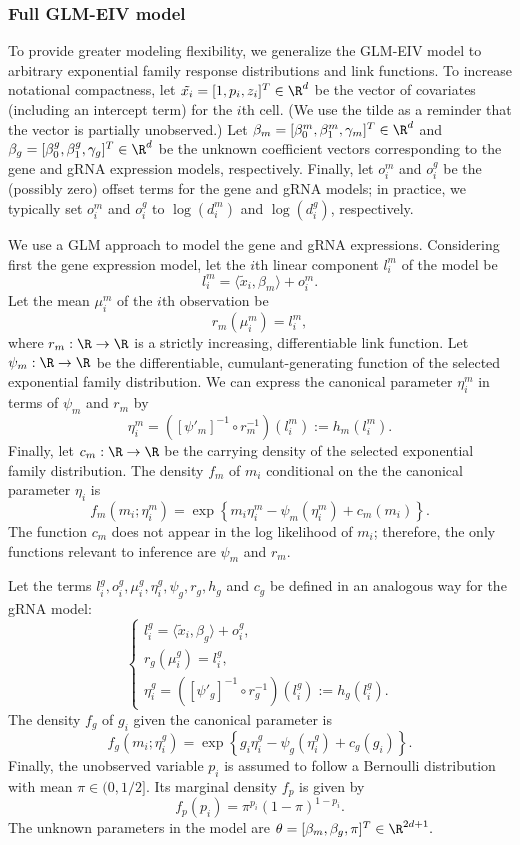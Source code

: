 \documentclass[12pt]{article}
\begin{document}
\subsubsection*{Full GLM-EIV model}
To provide greater modeling flexibility, we generalize the GLM-EIV model to arbitrary exponential family response distributions and link functions. To increase notational compactness, let $\tilde{x_i} = [1, p_i, z_i]^T \in \R^d$ be the vector of covariates (including an intercept term) for the $i$th cell. (We use the tilde as a reminder that the vector is partially unobserved.) Let $\beta_m = [\beta^m_0, \beta^m_1, \gamma_m]^T \in \R^d$ and $\beta_g = [\beta^g_0, \beta^g_1, \gamma_g]^T \in \R^d$ be the unknown coefficient vectors corresponding to the gene and gRNA expression models, respectively. Finally, let $o^m_i$ and $o^g_i$ be the (possibly zero) offset terms for the gene and gRNA models; in practice, we typically set $o^m_i$ and $o^g_i$ to $\log(d^m_i)$ and $\log(d^g_i)$, respectively.

We use a GLM approach to model the gene and gRNA expressions. Considering first the gene expression model, let the $i$th linear component $l^m_i$ of the model be $$l^m_i = \langle \tilde{x}_i, \beta_m \rangle + o^m_i.$$ Let the mean $\mu^m_i$ of the $i$th observation be
$$r_m(\mu^m_i) = l^m_i,$$ where $r_m:\R \to \R$ is a strictly increasing, differentiable link function. Let $\psi_m: \R \to \R$ be the differentiable, cumulant-generating function of the selected exponential family distribution. We can express the canonical parameter $\eta^m_i$ in terms of $\psi_m$ and $r_m$ by
$$\eta^m_i = \left([\psi'_m]^{-1} \circ r^{-1}_m\right)(l_i^m) := h_m(l_i^m).$$ Finally, let $c_m: \R \to \R$ be the carrying density of the selected exponential family distribution. The density $f_m$ of $m_i$ conditional on the the canonical parameter $\eta_i$ is
$$f_m(m_i; \eta^m_i) = \exp\left\{ m_i \eta^m_i - \psi_m(\eta^m_i) + c_m(m_i) \right\}.$$ The function $c_m$ does not appear in the log likelihood of $m_i$; therefore, the only functions relevant to inference are $\psi_m$ and $r_m$.

Let the terms $l^g_i, o^g_i, \mu^g_i, \eta^g_i, \psi_g, r_g, h_g$ and $c_g$ be defined in an analogous way for the gRNA model:
$$
\begin{cases}
l^g_i = \langle \tilde{x}_i, \beta_g \rangle + o^g_i,\\
r_g(\mu^g_i) = l^g_i,\\
\eta^g_i = \left([\psi'_g]^{-1} \circ r^{-1}_g\right)(l_i^g) := h_g(l_i^g).
\end{cases}
$$
The density $f_g$ of $g_i$ given the canonical parameter is
$$f_g(m_i; \eta^g_i) = \exp\left\{g_i \eta^g_i - \psi_g(\eta^g_i) + c_g(g_i)\right\}.$$
Finally, the unobserved variable $p_i$ is assumed to follow a Bernoulli distribution with mean $\pi \in (0, 1/2]$. Its marginal density $f_p$ is given by
$$f_p(p_i) = \pi^{p_i}(1-\pi)^{1 - p_i}.$$
The unknown parameters in the model are
$\theta = [\beta_m, \beta_g, \pi]^{T}  \in \R^{2d + 1}.$
\end{document}
